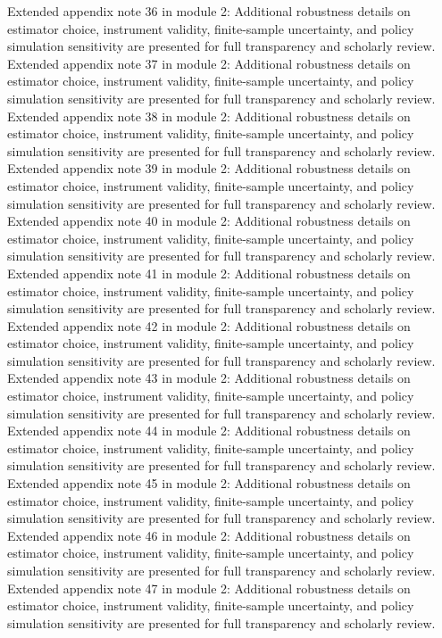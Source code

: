 \documentclass[preprint,12pt]{elsarticle}
\begin{document}
Extended appendix note 36 in module 2: Additional robustness details on estimator choice, instrument validity, finite-sample uncertainty, and policy simulation sensitivity are presented for full transparency and scholarly review.
Extended appendix note 37 in module 2: Additional robustness details on estimator choice, instrument validity, finite-sample uncertainty, and policy simulation sensitivity are presented for full transparency and scholarly review.
Extended appendix note 38 in module 2: Additional robustness details on estimator choice, instrument validity, finite-sample uncertainty, and policy simulation sensitivity are presented for full transparency and scholarly review.
Extended appendix note 39 in module 2: Additional robustness details on estimator choice, instrument validity, finite-sample uncertainty, and policy simulation sensitivity are presented for full transparency and scholarly review.
Extended appendix note 40 in module 2: Additional robustness details on estimator choice, instrument validity, finite-sample uncertainty, and policy simulation sensitivity are presented for full transparency and scholarly review.
Extended appendix note 41 in module 2: Additional robustness details on estimator choice, instrument validity, finite-sample uncertainty, and policy simulation sensitivity are presented for full transparency and scholarly review.
Extended appendix note 42 in module 2: Additional robustness details on estimator choice, instrument validity, finite-sample uncertainty, and policy simulation sensitivity are presented for full transparency and scholarly review.
Extended appendix note 43 in module 2: Additional robustness details on estimator choice, instrument validity, finite-sample uncertainty, and policy simulation sensitivity are presented for full transparency and scholarly review.
Extended appendix note 44 in module 2: Additional robustness details on estimator choice, instrument validity, finite-sample uncertainty, and policy simulation sensitivity are presented for full transparency and scholarly review.
Extended appendix note 45 in module 2: Additional robustness details on estimator choice, instrument validity, finite-sample uncertainty, and policy simulation sensitivity are presented for full transparency and scholarly review.
Extended appendix note 46 in module 2: Additional robustness details on estimator choice, instrument validity, finite-sample uncertainty, and policy simulation sensitivity are presented for full transparency and scholarly review.
Extended appendix note 47 in module 2: Additional robustness details on estimator choice, instrument validity, finite-sample uncertainty, and policy simulation sensitivity are presented for full transparency and scholarly review.
\end{document}
